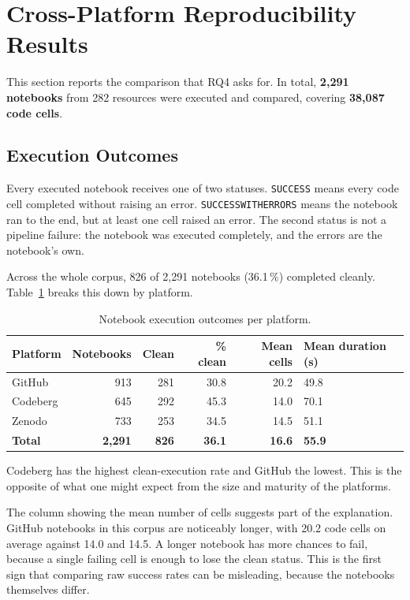 \section{Cross-Platform Reproducibility Results}
\label{sec:eval-cross-platform}

This section reports the comparison that RQ4 asks for. In total, \textbf{2{,}291 notebooks} from 282 resources were executed and compared, covering \textbf{38{,}087 code cells}.

\subsection{Execution Outcomes}

Every executed notebook receives one of two statuses. \texttt{SUCCESS} means every code cell completed without raising an error. \texttt{SUCCESS\ub WITH\ub ERRORS} means the notebook ran to the end, but at least one cell raised an error. The second status is not a pipeline failure: the notebook was executed completely, and the errors are the notebook's own.

Across the whole corpus, 826 of 2{,}291 notebooks (36.1\,\%) completed cleanly. Table~\ref{tab:exec-outcomes} breaks this down by platform.

\begin{table}[htbp]
\centering
\caption{Notebook execution outcomes per platform.}
\label{tab:exec-outcomes}
\small
\begin{tabularx}{\textwidth}{@{}l r r r r X@{}}
\toprule
Platform & Notebooks & Clean & \% clean & Mean cells & Mean duration (s)\tabularnewline
\midrule
GitHub & 913 & 281 & 30.8 & 20.2 & 49.8\tabularnewline
Codeberg & 645 & 292 & 45.3 & 14.0 & 70.1\tabularnewline
Zenodo & 733 & 253 & 34.5 & 14.5 & 51.1\tabularnewline
\midrule
\textbf{Total} & \textbf{2{,}291} & \textbf{826} & \textbf{36.1} & \textbf{16.6} & \textbf{55.9}\tabularnewline
\bottomrule
\end{tabularx}
\end{table}

Codeberg has the highest clean-execution rate and GitHub the lowest. This is the opposite of what one might expect from the size and maturity of the platforms.

The column showing the mean number of cells suggests part of the explanation. GitHub notebooks in this corpus are noticeably longer, with 20.2 code cells on average against 14.0 and 14.5. A longer notebook has more chances to fail, because a single failing cell is enough to lose the clean status. This is the first sign that comparing raw success rates can be misleading, because the notebooks themselves differ.

